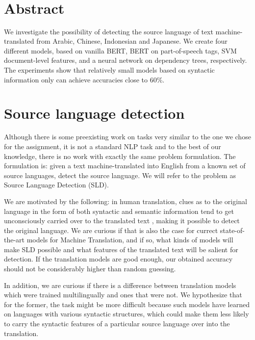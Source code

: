 \documentclass[twocolumn]{article}
\title{{\Huge \textbf{}} \\ }
\author{ \\ {\small }}
\date{}
\begin{document}
\maketitle
\section*{Abstract}

We investigate the possibility of detecting the source language of text machine-translated from Arabic, Chinese, Indonesian and Japanese. We create four different models, based on vanilla BERT, BERT on part-of-speech tags, SVM document-level features, and a neural network on dependency trees, respectively. The experiments show that relatively small models based on syntactic information only can achieve accuracies close to 60\%.

\section*{Source language detection}

Although there is some preexisting work on tasks very similar to the one we chose for the assignment, it is not a standard NLP task and to the best of our knowledge, there is no work with exactly the same problem formulation. The formulation is: given a text machine-translated into English from a known set of source languages, detect the source language. We will refer to the problem as Source Language Detection (SLD).

We are motivated by the following: in human translation, clues as to the original language in the form of both syntactic and semantic information tend to get unconsciously carried over to the translated text \cite{literary}, making it possible to detect the original language. We are curious if that is also the case for currect state-of-the-art models for Machine Translation, and if so, what kinds of models will make SLD possible and what features of the translated text will be salient for detection. If the translation models are good enough, our obtained accuracy should not be considerably higher than random guessing.

In addition, we are curious if there is a difference between translation models which were trained multilingually and ones that were not. We hypothesize that for the former, the task might be more difficult because such models have learned on languages with various syntactic structures, which could make them less likely to carry the syntactic features of a particular source language over into the translation.
\end{document}
